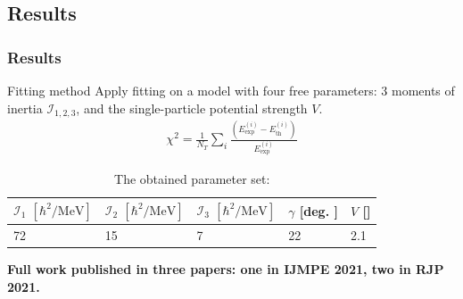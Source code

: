 \documentclass[
	11pt, %
]{beamer}
\begin{document}
\subsection{Results}

\begin{frame}
	\frametitle{Results}
	\begin{exampleblock}{Fitting method}
		Apply fitting on a model with four free parameters: 3 moments of inertia $\mathcal{I}_{1,2,3}$, and the single-particle potential strength $V$.
		\vspace{-0.2cm}
		\begin{align}
			\chi^2=\frac{1}{N_T}\sum_i\frac{\left(E_\text{exp}^{(i)}-E_\text{th}^{(i)}\right)}{E_\text{exp}^{(i)}}
		\end{align}
		\vspace{-1cm}
		\begin{table}
			\caption{The obtained parameter set:}
			\centering
				\begin{tabular}{lllll}
					\hline
					$\mathcal{I}_1$ $\left[\hbar^2/\text{MeV}\right]$ & $\mathcal{I}_2$ $\left[\hbar^2/\text{MeV}\right]$ & $\mathcal{I}_3$ $\left[\hbar^2/\text{MeV}\right]$ & $\gamma$ [deg. ] & $V$ [\text{MeV}] \\
					\hline
					\hline
					72              & 15              & 7               & 22       & 2.1\\
					\hline
				\end{tabular}
			\end{table}
	\end{exampleblock}
	\textbf{Full work published in three papers: one in IJMPE 2021, two in RJP 2021.}
\end{frame}
\end{document}
